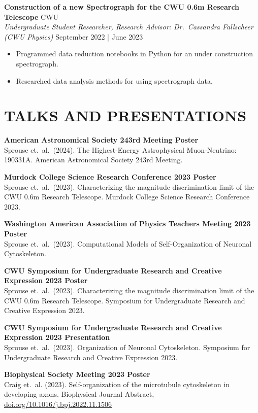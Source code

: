 \documentclass[a4paper,9pt]{extarticle}
\begin{document}
\noindent\textbf{Construction of a new Spectrograph for the CWU 0.6m Research Telescope} \hfill CWU\\
\textit{Undergraduate Student Researcher, Research Advisor: Dr.\ Cassandra Fallscheer (CWU Physics)} \hfill September 2022 | June 2023
\begin{itemize}
    \item Programmed data reduction notebooks in Python for an under construction spectrograph.
    \item Researched data analysis methods for using spectrograph data.
\end{itemize}


\section*{TALKS AND PRESENTATIONS}
\noindent\textbf{American Astronomical Society 243rd Meeting Poster}\\
Sprouse et.\ al.\ (2024). The Highest-Energy Astrophysical Muon-Neutrino: 190331A. American Astronomical Society 243rd Meeting.

\noindent\textbf{Murdock College Science Research Conference 2023 Poster}\\
Sprouse et.\ al.\ (2023). Characterizing the magnitude discrimination limit of the CWU 0.6m Research Telescope. Murdock College Science Research Conference 2023.

\noindent\textbf{Washington American Association of Physics Teachers Meeting 2023 Poster}\\
Sprouse et.\ al.\ (2023). Computational Models of Self-Organization of Neuronal Cytoskeleton.

\noindent\textbf{CWU Symposium for Undergraduate Research and Creative Expression 2023 Poster}\\
Sprouse et.\ al.\ (2023). Characterizing the magnitude discrimination limit of the CWU 0.6m Research Telescope. Symposium for Undergraduate Research and Creative Expression 2023.

\noindent\textbf{CWU Symposium for Undergraduate Research and Creative Expression 2023 Presentation}\\
Sprouse et.\ al.\ (2023). Organization of Neuronal Cytoskeleton. Symposium for Undergraduate Research and Creative Expression 2023.

\noindent\textbf{Biophysical Society Meeting 2023 Poster}\\
Craig et.\ al. (2023). Self-organization of the microtubule cytoskeleton in developing axons. Biophysical Journal Abstract, \href{www.doi.org/10.1016/j.bpj.2022.11.1506}{doi.org/10.1016/j.bpj.2022.11.1506}
\end{document}
